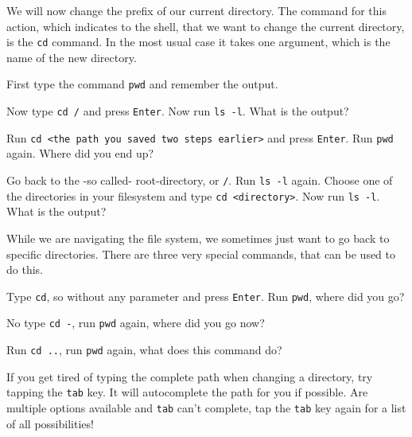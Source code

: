 \begin{challenge}
    \begin{task}
    We will now change the prefix of our current directory.
    The command for this action, which indicates to the shell, that we want to change the current directory, is the \texttt{cd} command.
    In the most usual case it takes one argument, which is the name of the new directory.
        \begin{questions}
            \item First type the command \texttt{pwd} and remember the output. 
            \item Now type \texttt{cd /} and press \texttt{Enter}. Now run \texttt{ls -l}. What is the output?
            \item Run \texttt{cd <the path you saved two steps earlier>} and press \texttt{Enter}. Run \texttt{pwd} again. Where did you end up?
            \item Go back to the -so called- root-directory, or \texttt{/}. Run \texttt{ls -l} again. Choose one of the directories in your filesystem and type \texttt{cd <directory>}. Now run \texttt{ls -l}. What is the output?
        \end{questions}
    \end{task}

    \begin{task}
    While we are navigating the file system, we sometimes just want to go back to specific directories.
    There are three very special commands, that can be used to do this.
        \begin{questions}
            \item Type \texttt{cd}, so without any parameter and press \texttt{Enter}. Run \texttt{pwd}, where did you go?
            \item No type \texttt{cd -}, run \texttt{pwd} again, where did you go now?
            \item Run \texttt{cd ..}, run \texttt{pwd} again, what does this command do?
        \end{questions}
    \end{task}
    \begin{advice}
        If you get tired of typing the complete path when changing a directory, try tapping the \texttt{tab} key.
        It will autocomplete the path for you if possible.
        Are multiple options available and \texttt{tab} can't complete, tap the \texttt{tab} key again for a list of all possibilities!
    \end{advice}
\end{challenge}
    

